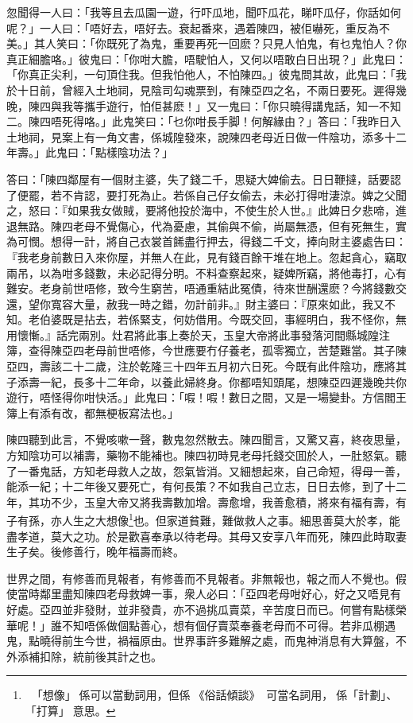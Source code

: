 \documentclass[a5paper, 12pt, openany]{book} %
\begin{document}
	忽聞得一人曰：「我等且去瓜園一遊，行吓瓜地，聞吓瓜花，睇吓瓜仔，你話如何呢？」一人曰：「唔好去，唔好去。衰起番來，遇着陳四，被佢嚇死，重反為不美。」其人笑曰：「你既死了為鬼，重要再死一回麽？只見人怕鬼，有乜鬼怕人？你真正細膽咯。」彼鬼曰：「你咁大膽，唔駛怕人，又何以唔敢白日出現？」此鬼曰：「你真正尖利，一句頂住我。但我怕他人，不怕陳四。」彼鬼問其故，此鬼曰：「我於十日前，曾經入土地祠，見陰司勾魂票到，有陳亞四之名，不兩日要死。遲得幾晚，陳四與我等攜手遊行，怕佢甚麽！」又一鬼曰：「你只曉得講鬼話，知一不知二。陳四唔死得咯。」此鬼笑曰：「乜你咁長手脚！何解緣由？」答曰：「我昨日入土地祠，見案上有一角文書，係城隍發來，說陳四老母近日做一件陰功，添多十二年壽。」此鬼曰：「點樣陰功法？」

	答曰：「陳四鄰屋有一個財主婆，失了錢二千，思疑大婢偷去。日日鞭撻，話要認了便罷，若不肯認，要打死為止。若係自己仔女偷去，未必打得咁淒涼。婢之父聞之，怒曰：『如果我女做賊，要將他投於海中，不使生於人世。』此婢日夕悲啼，進退無路。陳四老母不覺傷心，代為憂慮，其偷與不偷，尚屬無憑，但有死無生，實為可憫。想得一計，將自己衣裳首餙盡行押去，得錢二千文，捧向財主婆處告曰：『我老身前數日入來你屋，并無人在此，見有錢百餘干堆在地上。忽起貪心，竊取兩吊，以為咁多錢數，未必記得分明。不料查察起來，疑婢所竊，將他毒打，心有難安。老身前世唔修，致今生窮苦，唔通重結此冤債，待來世酬還麽？今將錢數交還，望你寬容大量，赦我一時之錯，勿計前非。』財主婆曰：『原來如此，我又不知。老伯婆既是拈去，若係緊支，何妨借用。今既交回，事經明白，我不怪你，無用懷慚。』話完兩別。灶君將此事上奏於天，玉皇大帝將此事發落河間縣城隍注簿，查得陳亞四老母前世唔修，今世應要冇仔養老，孤零獨立，苦楚難當。其子陳亞四，壽該二十二歲，注於乾隆三十四年五月初六日死。今既有此件陰功，應將其子添壽一紀，長多十二年命，以養此婦終身。你都唔知頭尾，想陳亞四遲幾晚共你遊行，唔怪得你咁快活。」此鬼曰：「㗇！㗇！數日之間，又是一場變卦。方信閻王簿上有添有改，都無梗板寫法也。」

	陳四聽到此言，不覺咳嗽一聲，數鬼忽然散去。陳四聞言，又驚又喜，終夜思量，方知陰功可以補壽，藥物不能補也。陳四初時見老母托錢交囬於人，一肚怒氣。聽了一番鬼話，方知老母救人之故，怨氣皆消。又細想起來，自己命短，得母一善，能添一紀；十二年後又要死亡，有何長策？不如我自己立志，日日去修，到了十二年，其功不少，玉皇大帝又將我壽數加增。壽愈增，我善愈積，將來有福有壽，有子有孫，亦人生之大想像\footnote{「想像」係可以當動詞用，但係󱪙《俗話傾談》󰧵󱀥可當名詞用，係「計劃」、「打算」󱝚意思。}也。但家道貧難，難做救人之事。細思善莫大於孝，能盡孝道，莫大之功。於是歡喜奉承以待老母。其母又安享八年而死，陳四此時取妻生子矣。後修善行，晚年福壽而終。

	世界之間，有修善而見報者，有修善而不見報者。非無報也，報之而人不覺也。假使當時鄰里盡知陳四老母救婢一事，衆人必曰：「亞四老母咁好心，好之又唔見有好處。亞四並非發財，並非發貴，亦不過挑瓜賣菜，辛苦度日而已。何嘗有點樣榮華呢！」誰不知唔係做個點善心，想有個仔賣菜奉養老母而不可得。若非瓜棚遇鬼，點曉得前生今世，禍福原由。世界事許多難解之處，而鬼神消息有大算盤，不外添補扣除，統前後其計之也。
\end{document}
